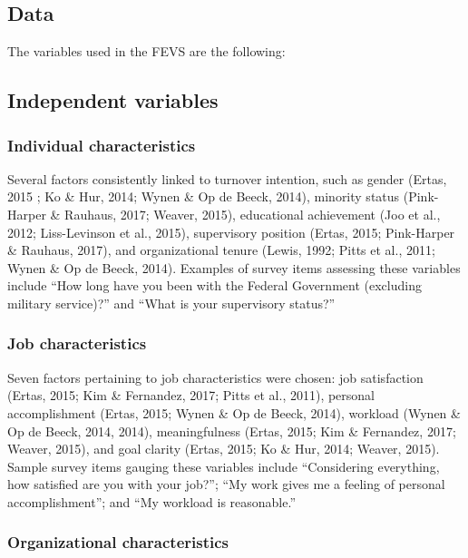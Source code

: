 \documentclass[
  man]{apa7}
\begin{document}
\hypertarget{data}{%
\subsection{Data}\label{data}}

The variables used in the FEVS are the following:

\hypertarget{independent-variables}{%
\subsection{Independent variables}\label{independent-variables}}

\hypertarget{individual-characteristics}{%
\subsubsection{Individual characteristics}\label{individual-characteristics}}

Several factors consistently linked to turnover intention, such as gender (Ertas, 2015 ; Ko \& Hur, 2014; Wynen \& Op de Beeck, 2014), minority status (Pink-Harper \& Rauhaus, 2017; Weaver, 2015), educational achievement (Joo et al., 2012; Liss-Levinson et al., 2015), supervisory position (Ertas, 2015; Pink-Harper \& Rauhaus, 2017), and organizational tenure (Lewis, 1992; Pitts et al., 2011; Wynen \& Op de Beeck, 2014).
Examples of survey items assessing these variables include ``How long have you been with the Federal Government (excluding military service)?'' and ``What is your supervisory status?''

\hypertarget{job-characteristics}{%
\subsubsection{Job characteristics}\label{job-characteristics}}

Seven factors pertaining to job characteristics were chosen: job satisfaction (Ertas, 2015; Kim \& Fernandez, 2017; Pitts et al., 2011), personal accomplishment (Ertas, 2015; Wynen \& Op de Beeck, 2014), workload (Wynen \& Op de Beeck, 2014, 2014), meaningfulness (Ertas, 2015; Kim \& Fernandez, 2017; Weaver, 2015), and goal clarity (Ertas, 2015; Ko \& Hur, 2014; Weaver, 2015).
Sample survey items gauging these variables include ``Considering everything, how satisfied are you with your job?''; ``My work gives me a feeling of personal accomplishment''; and ``My workload is reasonable.''

\hypertarget{organizational-characteristics}{%
\subsubsection{Organizational characteristics}\label{organizational-characteristics}}
\end{document}
